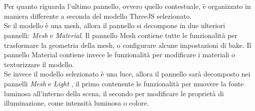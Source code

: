 \\
\\
Per quanto riguarda l’ultimo pannello, ovvero quello contestuale, è organizzato in maniera differente a seconda del modello ThreeJS selezionato.
\\ 
Se il modello è una mesh, allora il pannello si decompone in due ulteriori pannelli: \emph{Mesh} e \emph{Material}. Il pannello Mesh contiene tutte le funzionalità per trasformare la geometria della mesh, o configurare alcune impostazioni di bake. Il pannello Material contiene invece le funzionalità per modificare i materiali o texturizzare il modello.
\\
Se invece il modello selezionato è una luce, allora il pannello sarà decomposto nei pannelli \emph{Mesh} e \emph{Light} , il primo contenente le funzionalità per muovere la fonte luminosa all’interno della scena, il secondo per modificare le proprietà di illuminazione, come intensità luminosa o colore. 